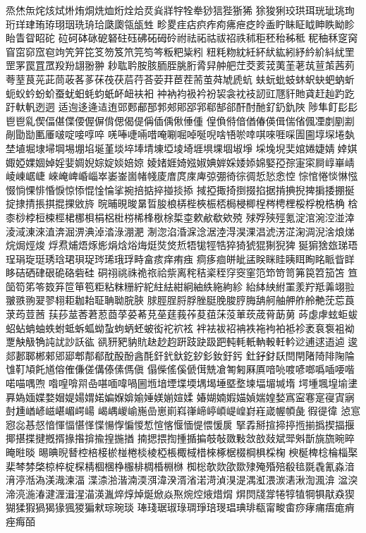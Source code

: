 烝烋缹烢烗烒烞烠烔烍烅烆烇烚烎烡牂牸牷牶猀狺狴狾狶
狳狻猁珓珙珥珖玼珧珣珩珜珒珛珔珝珚珗珘珨瓞瓟瓴瓵甡
畛畟疰痁疻痄痀疿疶疺皊盉眝眛眐眓眒眣眑眕眙眚眢眧砣
砬砢砵砯砨砮砫砡砩砳砪砱祔祛祏祜祓祒祑秫秬秠秮秭秪
秜秞秝窆窉窅窋窌窊窇竘笐笄笓笅笏笈笊笎笉笒粄粑粊粌
粈粍粅紞紝紑紎紘紖紓紟紒紏紌罜罡罞罠罝罛羖羒翃翂翀
耖耾耹胺胲胹胵脁胻脀舁舯舥茳茭荄茙荑茥荖茿荁茦茜茢
荂荎茛茪茈茼荍茖茤茠茷茯茩荇荅荌荓茞茬荋茧荈虓虒蚢
蚨蚖蚍蚑蚞蚇蚗蚆蚋蚚蚅蚥蚙蚡蚧蚕蚘蚎蚝蚐蚔衃衄衭衵
衶衲袀衱衿衯袃衾衴衼訒豇豗豻貤貣赶赸趵趷趶軑軓迾迵
适迿迻逄迼迶郖郠郙郚郣郟郥郘郛郗郜郤酐酎酏釕釢釚陜
陟隼飣⾽髟⾿鬯乿偰偪偡偞偠偓偋偝偲偈偍偁偛偊偢倕偅
偟偩偫偣偤偆偀偮偳偗偑凐剫剭剬剮勖勓匭厜啵啶唼啍啐
唴唪啑啢唶唵唰啒啅唌唲啥啎唹啈唭唻啀啋圊圇埻堔埢埶
埜埴堀埭埽堈埸堋埳埏堇埮埣埲埥埬埡堎埼堐埧堁堌埱埩
埰堍堄奜婠婘婕婧婞娸娵婭婐婟婥婬婓婤婗婃婝婒婄婛
婈媎娾婍娹婌婰婩婇婑婖婂婜孲孮寁寀屙崞崋崝崚崠崌崨
崍崦崥崏崰崒崣崟崮帾帴庱庴庹庲庳弶弸徛徖徟悊悐悆悾
悰悺惓惔惏惤惙惝惈悱惛悷惊悿惃惍惀挲捥掊掂捽掽掞掭
掝掗掫掎捯掇掐据掯捵掜捭掮捼掤挻掟捸掅掁掑掍捰敓旍
晥晡晛晙晜晢朘桹梇梐梜桭桮梮梫楖桯梣梬梩桵桴梲梏桷
梒桼桫桲梪梀桱桾梛梖梋梠梉梤桸桻梑梌梊桽欶欳欷欸殑
殏殍殎殌氪淀涫涴涳湴涬淩淢涷淶淔渀淈淠淟淖涾淥淜淝
淛淴淊涽淭淰涺淕淂淏淉淐淲淓淽淗淍淣涻烺焍烷焗烴焌
烰焄烳焐烼烿焆焓焀烸烶焋焂焎牾牻牼牿猝猗猇猑猘猊猈
狿猏猞玈珶珸珵琄琁珽琇琀珺珼珿琌琋珴琈畤畣痎痒痏痋
痌痑痐皏皉盓眹眯眭眱眲眴眳眽眥眻眵硈硒硉硍硊硌砦硅
硐祤祧祩祪祣祫祡离秺秸秶秷窏窔窐笵笻笴笥笰笢笤笳笘
笪笝笱笫笭笯笲笸笚笣粔粘粖粣紵紽紸紶紺絅紬紩絁絇紾
紿絊紻紨罣羕羜羝羛翊翋翍翐翑翇翏翉耟耞耛聇聃聈脘脥
脙脛脭脟脬脞脡脕脧脝脢舑舸舳舺舴舲艴莐莣莨莍荺荳莤
荴莏莁莕莙荵莔莩荽莃莌莝莛莪莋荾莥莯莈莗莰荿莦莇莮
荶虙虖蚿蚷蛂蛁蛅蚺蚰蛈蚹蚳蚸蛌蚴蚻蚼蛃蚽蚾衒袉袕袨
袢袪袚袑袡袟袘袧袙袛袗袤袬袌袓袎覂觖觙觕訰訧訬訞谹
谻豜豝豽貥赽赻赹趼跂趹趿跁軘軞軝軜軗軠軡逤逋逑逜逌
逡郯郪郰郴郲郳郔郫郬郩酖酘酚酓酕釬釴釱釳釸釤釹釪釫
釷釨釮镺閆閈陼陭陫陱陯隿靪頄飥馗傛傕傔傞傋傣傃傌傎
傝偨傜傒傂傇兟凔匒匑厤厧喑喨喥喭啷噅喢喓喈喏喵喁喣
喒喤啽喌喦啿喕喡喎圌堩堷堙堞堧堣堨埵塈堥堜堛堳堿堶
堮堹堸堭堬堻奡媯媔媟婺媢媞婸媦婼媥媬媕媮娷媄媊媗媃
媋媩婻婽媌媜媏媓媝寪寍寋寔寑寊寎尌尰崷嵃嵫嵁嵋崿崵
嵑嵎嵕崳崺嵒崽崱嵙嵂崹嵉崸崼崲崶嵀嵅幄幁彘徦徥徫
惉悹惌惢惎惄愔惲愊愖愅惵愓惸惼惾惁愃愘愝愐惿愄愋扊
掔掱掰揎揥揨揯揃撝揳揊揠揶揕揲揵摡揟掾揝揜揄揘揓揂
揇揌揋揈揰揗揙攲敧敪敤敜敨敥斌斝斞斮旐旒晼晬晻暀晱
晹晪晲朁椌棓椄棜椪棬棪棱椏棖棷棫棤棶椓椐棳棡椇棌椈
楰梴椑棯棆椔棸棐棽棼棨椋椊椗棎棈棝棞棦棴棑椆棔棩椕
椥棇欹欻欿欼殔殗殙殕殽毰毲毳氰淼湆湇渟湉溈渼渽湅湢
渫渿湁湝湳渜渳湋湀湑渻渃渮湞湨湜湡渱渨湠湱湫渹渢渰
湓湥渧湸湤湷湕湹湒湦渵渶湚焠焞焯烻焮焱焣焥焢焲焟焨
焺焛牋牚犈犉犆犅犋猒猋猰猢猱猳猧猲猭猦猣猵猌琮琬琰
琫琖琚琡琭琱琤琣琝琩琠琲瓻甯畯畬痧痚痡痦痝痟痤痗皕
